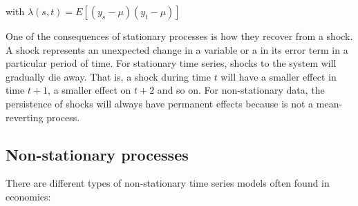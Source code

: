\noindent with $\lambda(s,t) = E[(y_s-\mu)(y_t - \mu)]$ 

One of the consequences of stationary processes is how they recover from a
shock. A shock represents an unexpected change in a variable or a in its error
term in a particular period of time. For stationary time series, shocks to the
system will gradually die away. That is, a shock during time $t$ will have a
smaller effect in time $t+1$, a smaller effect on $t+2$ and so on. For
non-stationary data, the persistence of shocks will always have permanent
effects because is not a mean-reverting process. 

\subsection{Non-stationary processes}

There are different types of non-stationary time series models often found in economics:


